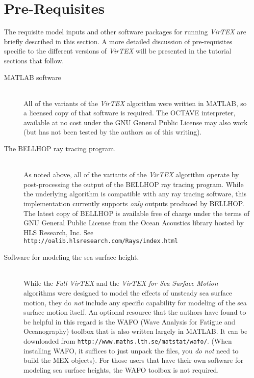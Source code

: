 \documentclass[12pt, letterpaper, oneside]{article}
\begin{document}
\section{Pre-Requisites}

The requisite model inputs and other software packages for running
{\em VirTEX} are briefly described in this section. A more detailed
discussion of pre-requisites specific to the different versions of
{\em VirTEX} will be presented in the tutorial sections that follow.

\begin{description}
\item[MATLAB software]\hfill \\
All of the variants of the {\em VirTEX} algorithm were written
in MATLAB, so a licensed copy of that software is required. The OCTAVE
interpreter, available at no cost under the GNU General Public License
may also work (but has not been tested by the authors as of this writing).

\item[The BELLHOP ray tracing program.]\hfill \\
As noted above, all of the variants of the {\em VirTEX} algorithm
operate by post-processing the output of the BELLHOP ray tracing
program. While the underlying algorithm is compatible with any
ray tracing software, this implementation currently supports {\em only}
outputs produced by BELLHOP. The latest copy of BELLHOP is available
free of charge under the terms of GNU General Public License from
the Ocean Acoustics library hosted by HLS Research, Inc. See {\tt
http://oalib.hlsresearch.com/Rays/index.html}

\item[Software for modeling the sea surface height.]\hfill \\
While the {\em Full VirTEX} and the {\em VirTEX for Sea Surface Motion}
algorithms were designed to model the effects of unsteady sea surface
motion, they do {\em not} include any specific capability for modeling of
the sea surface motion itself.  An optional resource that the authors have
found to be helpful in this regard is the WAFO (Wave Analysis for Fatigue
and Oceanography) toolbox that is also written largely in MATLAB. It can
be downloaded from {\tt http://www.maths.lth.se/matstat/wafo/}. (When
installing WAFO, it suffices to just unpack the files, you {\em do not}
need to build the MEX objects). For those users that have their own
software for modeling sea surface heights, the WAFO toolbox is not
required.


\end{description}
\end{document}
